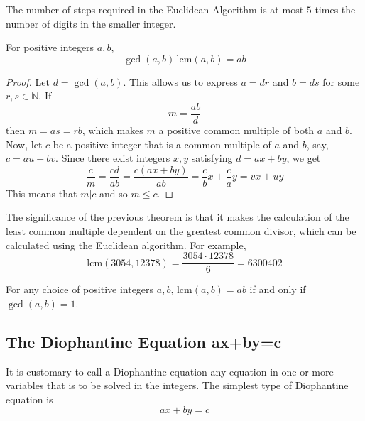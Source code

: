 \documentclass{article}
\newcounter{theorem}[section]
\newcounter{example}[section]
\begin{document}
\begin{theorem}[Lame]
  \label{thm:lame}
The number of steps required in the Euclidean Algorithm is at most $5$ times the number of digits in the smaller integer. 
\end{theorem}

\begin{theorem}
  \label{thm:product-of-gcd-and-lcm}
For positive integers $a, b$, 
\begin{equation}
  \gcd(a, b) \, \text{lcm}(a, b) = ab
\end{equation}
\end{theorem}
\begin{proof}
Let $d = \gcd(a, b)$. This allows us to express $a= dr$ and $b = ds$ for some $r, s \in \mathbb{N}$. If 
\begin{equation}
  m = \frac{ab}{d}
\end{equation}
then $m = as = rb$, which makes $m$ a positive common multiple of both $a$ and $b$. Now, let $c$ be a positive integer that is a common multiple of $a$ and $b$, say, $c = au + bv$. Since there exist integers $x, y$ satisfying $d = ax + by$, we get
\begin{equation}
  \frac{c}{m} = \frac{cd}{ab} = \frac{c(ax+by)}{ab} = \frac{c}{b} x + \frac{c}{a} y = vx + uy
\end{equation}
This means that $m |c$ and so $m \leq c$. 
\end{proof}

The significance of the previous theorem is that it makes the calculation of the least common multiple dependent on the \hyperref[def:greatest-common-divisor]{greatest common divisor}, which can be calculated using the Euclidean algorithm. For example, 
\begin{equation}
  \text{lcm}(3054, 12378) = \frac{3054 \cdot 12378}{6} = 6300402
\end{equation}

\begin{corollary}
  \label{thm:lcm-equals-product-exactly-when-coprime}
For any choice of positive integers $a, b$, $\text{lcm}(a, b) = ab$ if and only if $\gcd(a, b) = 1$. 
\end{corollary}

\subsection{The Diophantine Equation ax+by=c}
It is customary to call a Diophantine equation any equation in one or more variables that is to be solved in the integers. The simplest type of Diophantine equation is
\begin{equation}
  a x+ by = c
\end{equation}
\end{document}
